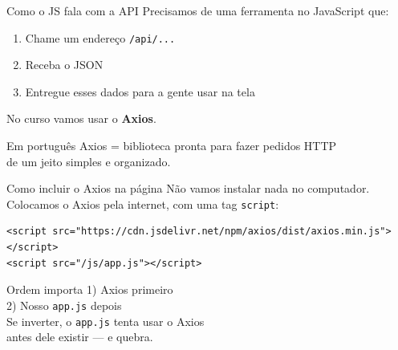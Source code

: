 \documentclass[aspectratio=169,11pt]{beamer}
\begin{document}
\begin{frame}{Como o JS fala com a API}
  Precisamos de uma ferramenta no JavaScript que:
  \begin{enumerate}
    \item Chame um endereço \texttt{/api/...}
    \item Receba o JSON
    \item Entregue esses dados para a gente usar na tela
  \end{enumerate}

  \vspace{0.7em}
  No curso vamos usar o \textbf{Axios}.

  \vspace{0.4em}
  \begin{block}{Em português}
    Axios = biblioteca pronta para fazer pedidos HTTP\\
    de um jeito simples e organizado.
  \end{block}
\end{frame}

\begin{frame}[fragile]{Como incluir o Axios na página}
  Não vamos instalar nada no computador.\\
  Colocamos o Axios pela internet, com uma tag \texttt{script}:

\begin{lstlisting}[basicstyle=\ttfamily\footnotesize]
<script src="https://cdn.jsdelivr.net/npm/axios/dist/axios.min.js"></script>
<script src="/js/app.js"></script>
\end{lstlisting}

  \vspace{0.5em}
  \begin{alertblock}{Ordem importa}
    1) Axios primeiro\\
    2) Nosso \texttt{app.js} depois\\[0.3em]
    Se inverter, o \texttt{app.js} tenta usar o Axios\\
    antes dele existir --- e quebra.
  \end{alertblock}
\end{frame}
\end{document}
